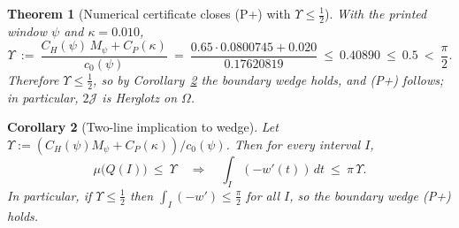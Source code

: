 \documentclass[11pt]{article}
\providecommand{\Mpsilocked}{0.0800745}%
\newtheorem{theorem}{Theorem}
\newtheorem{corollary}[theorem]{Corollary}
\theoremstyle{definition}
\theoremstyle{remark}
\begin{document}
\begin{theorem}[Numerical certificate closes (P+) with $\Upsilon\le \tfrac12$]\label{thm:numeric-close-stage2}
With the printed window $\psi$ and $\kappa=0.010$,
\[
 \Upsilon\ :=\ \frac{C_H(\psi)\,M_\psi + C_P(\kappa)}{c_0(\psi)}
 \ =\ \frac{0.65\cdot \Mpsilocked + 0.020}{0.17620819}
 \ \le\ 0.40890\ \le\ 0.5\ <\ \frac{\pi}{2}.
\]
Therefore $\Upsilon\le \tfrac12$, so by Corollary~\ref{cor:wedge-half} the boundary wedge holds, and \textup{(P+)} follows; in particular, $2\mathcal J$ is Herglotz on $\Omega$.
\end{theorem}
\begin{corollary}[Two-line implication to wedge]\label{cor:wedge-half}
Let $\Upsilon:=(C_H(\psi)M_\psi+C_P(\kappa))/c_0(\psi)$. Then for every interval $I$,
\[
  \mu\!\big(Q(I)\big)\ \le\ \Upsilon
  \quad\Rightarrow\quad
  \int_I (-w'(t))\,dt\ \le\ \pi\,\Upsilon.
\]
In particular, if $\Upsilon\le \tfrac12$ then $\int_I (-w')\le \tfrac{\pi}{2}$ for all $I$, so the boundary wedge \emph{(P+)} holds.
\end{corollary}
\end{document}
